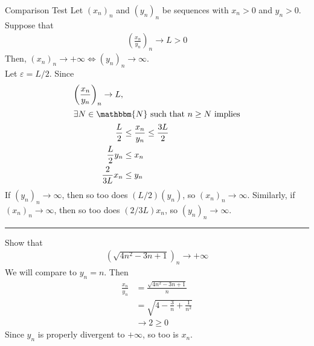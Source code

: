 \documentclass[10pt]{extarticle}
\newcommand{\N}{\mathbbm{N}}
\begin{document}
  \begin{problem}{Comparison Test}
    Let $(x_n)_n$ and $(y_n)_n$ be sequences with $x_n > 0$ and $y_n > 0$. Suppose that 
    \begin{align*}
      \left(\frac{x_n}{y_n}\right)_n \rightarrow L > 0
    \end{align*}
    Then, $(x_n)_n \rightarrow +\infty \Leftrightarrow (y_n)_n \rightarrow \infty$.\\

    Let $\varepsilon = L/2$. Since
    \begin{align*}
      \left(\frac{x_n}{y_n}\right)_n \rightarrow L,\\
      \shortintertext{$\exists N \in\N$ such that $n\geq N$ implies}
      \frac{L}{2} &\leq \frac{x_n}{y_n} \leq \frac{3L}{2}\\
      \frac{L}{2}y_n  &\leq x_n\\
      \frac{2}{3L}x_n &\leq y_n
    \end{align*}
    If $(y_n)_n \rightarrow \infty$, then so too does $(L/2)(y_n)$, so $(x_n)_n\rightarrow\infty$. Similarly, if $(x_n)_n\rightarrow\infty$, then so too does $(2/3L)x_n$, so $(y_n)_n\rightarrow\infty$.\\
    \vspace{4pt}
    \rule{\textwidth}{0.4pt}
    \vspace{4pt}
    Show that
    \begin{align*}
      \left(\sqrt{4n^2 -3n + 1}\right)_n \rightarrow +\infty
    \end{align*}
    We will compare to $y_n = n$. Then
    \begin{align*}
      \frac{x_n}{y_n} &= \frac{\sqrt{4n^2-3n+1}}{n}\\
                      &= \sqrt{4 - \frac{3}{n} + \frac{1}{n^2}}\\
                      &\rightarrow 2 \geq 0
    \end{align*}
    Since $y_n$ is properly divergent to $+\infty$, so too is $x_n$.
  \end{problem}
\end{document}
